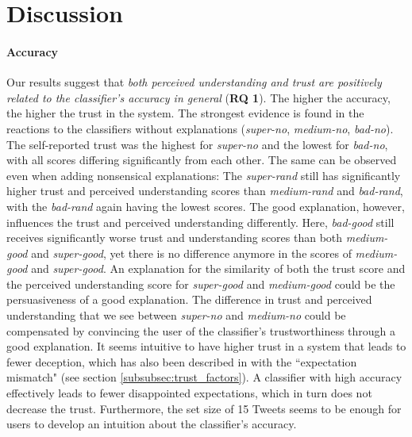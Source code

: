 \section{Discussion}
\paragraph{Accuracy} 
Our results suggest that \textit{both perceived understanding and trust are positively related to the classifier's accuracy in general} (\textbf{RQ 1}). The higher the accuracy, the higher the trust in the system. The strongest evidence is found in the reactions to the classifiers without explanations (\textit{super-no}, \textit{medium-no}, \textit{bad-no}). The self-reported trust was the highest for \textit{super-no} and the lowest for \textit{bad-no}, with all scores differing significantly from each other. The same can be observed even when adding nonsensical explanations: The \textit{super-rand} still has significantly higher trust and perceived understanding scores than \textit{medium-rand} and \textit{bad-rand}, with the \textit{bad-rand} again having the lowest scores. The good explanation, however, influences the trust and perceived understanding differently. Here, \textit{bad-good} still receives significantly worse trust and understanding scores than both \textit{medium-good} and \textit{super-good}, yet there is no difference anymore in the scores of \textit{medium-good} and \textit{super-good}. An explanation for the similarity of both the trust score and the perceived understanding score for \textit{super-good} and \textit{medium-good} could be the persuasiveness of a good explanation. The difference in trust and perceived understanding that we see between \textit{super-no} and \textit{medium-no} could be compensated by convincing the user of the classifier's trustworthiness through a good explanation.\newline
It seems intuitive to have higher trust in a system that leads to fewer deception, which has also been described in \cite{glass2008toward} with the ``expectation mismatch" (see section \ref{subsubsec:trust_factors}). A classifier with high accuracy effectively leads to fewer disappointed expectations, which in turn does not decrease the trust. Furthermore, the set size of 15 Tweets seems to be enough for users to develop an intuition about the classifier's accuracy.\newline
